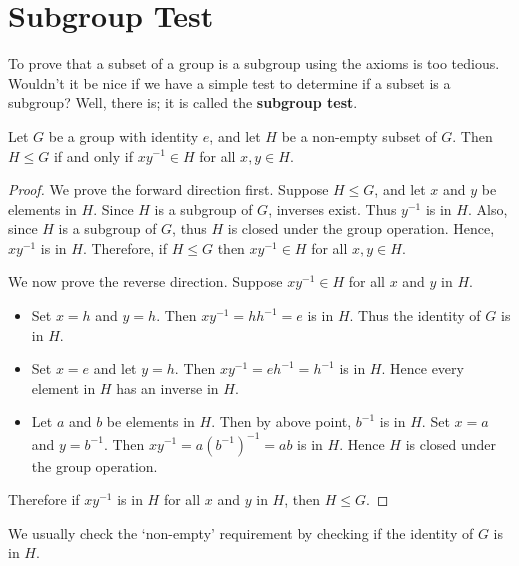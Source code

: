 \section{Subgroup Test}
To prove that a subset of a group is a subgroup using the axioms is too tedious. Wouldn't it be nice if we have a simple test to determine if a subset is a subgroup? Well, there is; it is called the \textbf{subgroup test}.
\begin{theorem}\label{thrm-subgroup-test}
    Let $G$ be a group with identity $e$, and let $H$ be a non-empty subset of $G$. Then $H \leq G$ if and only if $xy^{-1} \in H$ for all $x, y \in H$.
\end{theorem}
\begin{proof}
    We prove the forward direction first. Suppose $H \leq G$, and let $x$ and $y$ be elements in $H$. Since $H$ is a subgroup of $G$, inverses exist. Thus $y^{-1}$ is in $H$. Also, since $H$ is a subgroup of $G$, thus $H$ is closed under the group operation. Hence, $xy^{-1}$ is in $H$. Therefore, if $H \leq G$ then $xy^{-1} \in H$ for all $x, y \in H$.

    We now prove the reverse direction. Suppose $xy^{-1}\in H$ for all $x$ and $y$ in $H$.
    \begin{itemize}
        \item Set $x = h$ and $y = h$. Then $xy^{-1} = hh^{-1} = e$ is in $H$. Thus the identity of $G$ is in $H$.
        \item Set $x = e$ and let $y = h$. Then $xy^{-1} = eh^{-1} = h^{-1}$ is in $H$. Hence every element in $H$ has an inverse in $H$.
        \item Let $a$ and $b$ be elements in $H$. Then by above point, $b^{-1}$ is in $H$. Set $x = a$ and $y = b^{-1}$. Then $xy^{-1} = a\left(b^{-1}\right)^{-1} = ab$ is in $H$. Hence $H$ is closed under the group operation.
    \end{itemize}
    Therefore if $xy^{-1}$ is in $H$ for all $x$ and $y$ in $H$, then $H \leq G$.
\end{proof}
\begin{remark}
    We usually check the `non-empty' requirement by checking if the identity of $G$ is in $H$.
\end{remark}

